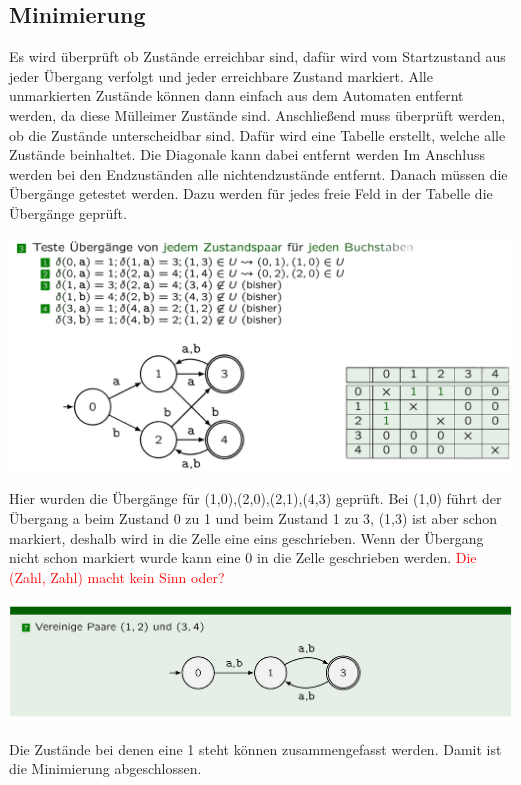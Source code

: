 \documentclass[12pt,a4paper]{article}
\begin{document}
	\subsection{Minimierung}
	Es wird überprüft ob Zustände erreichbar sind, dafür wird vom Startzustand aus jeder Übergang verfolgt und jeder erreichbare Zustand markiert. Alle unmarkierten Zustände können dann einfach aus dem Automaten entfernt werden, da diese Mülleimer Zustände sind. Anschließend muss überprüft werden, ob die Zustände unterscheidbar sind.
	Dafür wird eine Tabelle erstellt, welche alle Zustände beinhaltet. Die Diagonale kann dabei entfernt werden Im Anschluss werden bei den Endzuständen alle nichtendzustände entfernt. Danach müssen die Übergänge getestet werden. Dazu werden für jedes freie Feld in der Tabelle die Übergänge geprüft.\newline
	\begin{center}
			\includegraphics[width=\textwidth]{Bilder/MinimizingUbergangBsp.png}
	\end{center}
	Hier wurden die Übergänge für (1,0),(2,0),(2,1),(4,3) geprüft. Bei (1,0) führt der Übergang a beim Zustand 0 zu 1 und beim Zustand 1 zu 3, (1,3) ist aber schon markiert, deshalb wird in die Zelle eine eins geschrieben. Wenn der Übergang nicht schon markiert wurde kann eine 0 in die Zelle geschrieben werden. \textcolor{red}{Die (Zahl, Zahl) macht kein Sinn oder?}\newline
	\begin{center}
	\includegraphics[width=\textwidth]{Bilder/MinimizingVereinigung.png}
	\end{center}
	Die Zustände bei denen eine 1 steht können zusammengefasst werden. Damit ist die Minimierung abgeschlossen.
\end{document}
